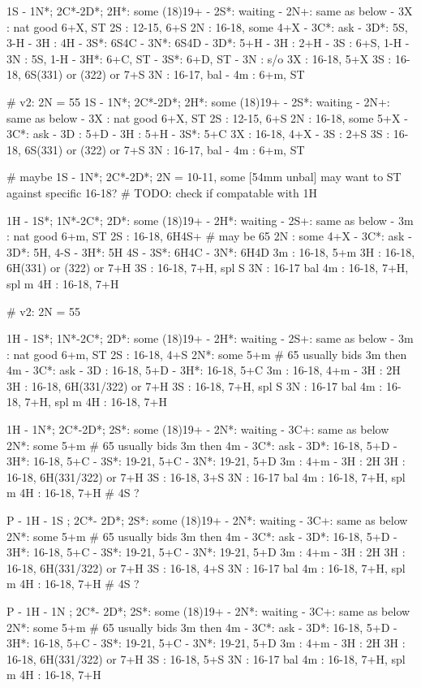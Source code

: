 1S - 1N*; 2C*-2D*; 
2H*: some (18)19+
   - 2S*: waiting
           - 2N+: same as below
   - 3X : nat good 6+X, ST
2S : 12-15, 6+S
2N : 16-18, some 4+X
   - 3C*: ask
        - 3D*: 5S, 3-H
        - 3H : 4H
        - 3S*: 6S4C
        - 3N*: 6S4D
   - 3D*: 5+H
        - 3H : 2+H
        - 3S : 6+S, 1-H
        - 3N : 5S, 1-H
   - 3H*: 6+C, ST
   - 3S*: 6+D, ST
   - 3N : s/o
3X : 16-18, 5+X
3S : 16-18, 6S(331) or (322) or 7+S
3N : 16-17, bal
   - 4m : 6+m, ST

# v2: 2N = 55
1S - 1N*; 2C*-2D*; 
2H*: some (18)19+
   - 2S*: waiting
           - 2N+: same as below
   - 3X : nat good 6+X, ST
2S : 12-15, 6+S
2N : 16-18, some 5+X
   - 3C*: ask
        - 3D : 5+D
        - 3H : 5+H
        - 3S*: 5+C
3X : 16-18, 4+X
   - 3S : 2+S
3S : 16-18, 6S(331) or (322) or 7+S
3N : 16-17, bal
   - 4m : 6+m, ST

# maybe 1S - 1N*; 2C*-2D*; 2N = 10-11, some [54mm unbal] may want to ST against specific 16-18? 
# TODO: check if compatable with 1H

1H - 1S*; 1N*-2C*; 
2D*: some (18)19+
   - 2H*: waiting
        - 2S+: same as below
   - 3m : nat good 6+m, ST
2S : 16-18, 6H4S+  # may be 65
2N : some 4+X
   - 3C*: ask
        - 3D*: 5H, 4-S
        - 3H*: 5H 4S
        - 3S*: 6H4C
        - 3N*: 6H4D
3m : 16-18, 5+m
3H : 16-18, 6H(331) or (322) or 7+H
3S : 16-18, 7+H, spl S
3N : 16-17 bal
4m : 16-18, 7+H, spl m
4H : 16-18, 7+H

# v2: 2N = 55

1H - 1S*; 1N*-2C*; 
2D*: some (18)19+
   - 2H*: waiting
        - 2S+: same as below
   - 3m : nat good 6+m, ST
2S : 16-18, 4+S
2N*: some 5+m  # 65 usually bids 3m then 4m
   - 3C*: ask
        - 3D : 16-18, 5+D
        - 3H*: 16-18, 5+C
3m : 16-18, 4+m
   - 3H : 2H
3H : 16-18, 6H(331/322) or 7+H
3S : 16-18, 7+H, spl S
3N : 16-17 bal
4m : 16-18, 7+H, spl m
4H : 16-18, 7+H

1H - 1N*; 2C*-2D*; 
2S*: some (18)19+
   - 2N*: waiting
        - 3C+: same as below
2N*: some 5+m  # 65 usually bids 3m then 4m
   - 3C*: ask
        - 3D*: 16-18, 5+D
        - 3H*: 16-18, 5+C
        - 3S*: 19-21, 5+C
        - 3N*: 19-21, 5+D
3m : 4+m
   - 3H : 2H
3H : 16-18, 6H(331/322) or 7+H
3S : 16-18, 3+S
3N : 16-17 bal
4m : 16-18, 7+H, spl m
4H : 16-18, 7+H
# 4S ?


P - 1H - 1S ; 2C*- 2D*; 
2S*: some (18)19+
   - 2N*: waiting
        - 3C+: same as below
2N*: some 5+m  # 65 usually bids 3m then 4m
   - 3C*: ask
        - 3D*: 16-18, 5+D
        - 3H*: 16-18, 5+C
        - 3S*: 19-21, 5+C
        - 3N*: 19-21, 5+D
3m : 4+m
   - 3H : 2H
3H : 16-18, 6H(331/322) or 7+H
3S : 16-18, 4+S
3N : 16-17 bal
4m : 16-18, 7+H, spl m
4H : 16-18, 7+H
# 4S ?

P - 1H - 1N ; 2C*- 2D*; 
2S*: some (18)19+
   - 2N*: waiting
        - 3C+: same as below
2N*: some 5+m  # 65 usually bids 3m then 4m
   - 3C*: ask
        - 3D*: 16-18, 5+D
        - 3H*: 16-18, 5+C
        - 3S*: 19-21, 5+C
        - 3N*: 19-21, 5+D
3m : 4+m
   - 3H : 2H
3H : 16-18, 6H(331/322) or 7+H
3S : 16-18, 5+S
3N : 16-17 bal
4m : 16-18, 7+H, spl m
4H : 16-18, 7+H
